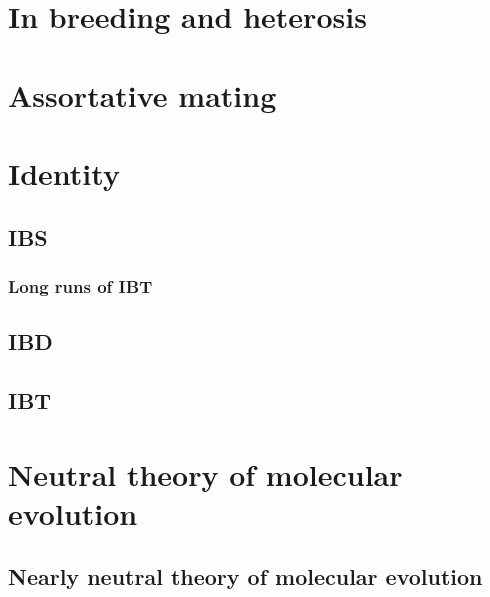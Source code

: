 \documentclass[]{book}
\theoremstyle{definition}
\theoremstyle{definition}
\theoremstyle{definition}
\theoremstyle{remark}
\begin{document}
\chapter{In breeding and heterosis}\label{in-breeding-and-heterosis}

\chapter{Assortative mating}\label{assortative-mating}

\chapter{Identity}\label{identity}

\section{IBS}\label{ibs}

\subsection{Long runs of IBT}\label{long-runs-of-ibt}

\section{IBD}\label{ibd}

\section{IBT}\label{ibt}

\chapter{Neutral theory of molecular
evolution}\label{neutral-theory-of-molecular-evolution}

\section{Nearly neutral theory of molecular
evolution}\label{nearly-neutral-theory-of-molecular-evolution}


\end{document}
